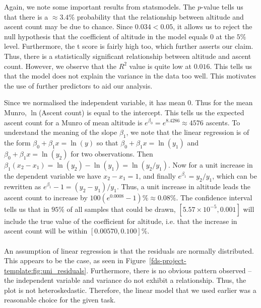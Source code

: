 \documentclass[11pt,a4paper]{article}
\begin{document}
Again, we note some important results from statsmodels. The $p$-value tells us that there is a $\approx 3.4\%$ probability that the relationship between altitude and ascent count may be due to chance. Since $0.034 < 0.05$, it allows us to reject the null hypothesis that the coefficient of altitude in the model equals 0 at the $5\%$ level. Furthermore, the t score is fairly high too, which further asserts our claim. Thus, there is a statistically significant relationship between altitude and ascent count. However, we observe that the $R^{2}$ value is quite low at $0.016$. This tells us that the model does not explain the variance in the data too well. This motivates the use of further predictors to aid our analysis.

Since we normalised the independent variable, it has mean 0. Thus for the mean Munro, $\ln$(Ascent count) is equal to the intercept. This tells us the expected ascent count for a Munro of mean altitude is $e^{\beta_0}=e^{8.4286}\approx 4576$ ascents. To understand the meaning of the slope $\beta_1$, we note that the linear regression is of the form $\beta_0 + \beta_1x = \ln(y)$ so that $\beta_0 + \beta_1x = \ln(y_1)$ and $\beta_0 + \beta_1x = \ln(y_2)$ for two observations. Then $\beta_1(x_2 - x_1) = \ln(y_2) - \ln(y_1) = \ln(y_2 / y_1)$. Now for a unit increase in the dependent variable we have $x_2 - x_1 = 1$, and finally $e^{\beta_1} = y_2 / y_1$, which can be rewritten as $e^{\beta_1} - 1 = (y_2 - y_1) / y_1$. Thus, a unit increase in altitude leads the ascent count to increase by $100(e^{0.0008} - 1)\% \approx 0.08\%$. The confidence interval tells us that in $95\%$ of all samples that could be drawn, $[5.57 \times 10^{-5}, 0.001]$ will include the true value of the coefficient for altitude, i.e. that the increase in ascent count will be within $[0.00570, 0.100]\%$.\\ \\
An assumption of linear regression is that the residuals are normally distributed. This appears to be the case, as seen in Figure~\ref{fds-project-template:fig:uni_residuals}. Furthermore, there is no obvious pattern observed – the independent variable and variance do not exhibit a relationship. 
Thus, the plot is not heteroskedastic. Therefore, the linear model that we used earlier was a reasonable choice for the given task.\\ \\
\end{document}
